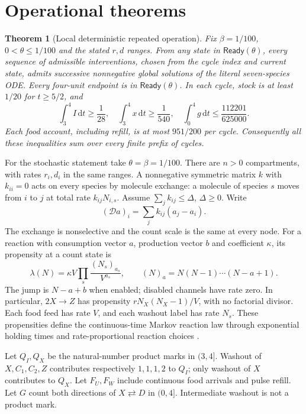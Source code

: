 \documentclass[11pt]{article}
\newtheorem{theorem}{Theorem}
\theoremstyle{definition}\newtheorem{definition}[theorem]{Definition}
\newcommand{\Ready}{\mathsf{Ready}}
\newcommand{\dd}{\,\mathrm dt}
\begin{document}
\pagebreak[3]
\section{Operational theorems}
\begin{theorem}[Local deterministic repeated operation]\label{thm:det}
Fix $\beta=1/100$, $0<\theta\le1/100$ and the stated $r,d$ ranges.
From any state in $\Ready(\theta)$, every sequence of admissible interventions,
chosen from the cycle index and current state, admits successive nonnegative global
solutions of the literal seven-species ODE. Every four-unit endpoint is in
$\Ready(\theta)$. In each cycle, stock is at least $1/20$ for $t\ge5/2$, and
\begin{equation}\label{eq:detoutputs}
\int_3^4 I\dd\ge\frac1{28},\quad
\int_3^4 x\dd\ge\frac1{540},\quad
\int_0^4 g\dd\le\frac{112201}{625000}.
\end{equation}
Each food account, including refill, is at most $951/200$ per cycle.
Consequently all these inequalities sum over every finite prefix of cycles.
\end{theorem}

For the stochastic statement take $\theta=\beta=1/100$. There are $n>0$ compartments,
with rates $r_i,d_i$ in the same ranges. A nonnegative symmetric matrix $k$ with $k_{ii}=0$ acts on every
species by molecule exchange: a molecule of species $s$ moves from $i$ to $j$ at total
rate $k_{ij}N_{i,s}$. Assume $\sum_j k_{ij}\le\Delta$, $\Delta\ge0$. Write
\[
(\mathcal D a)_i=\sum_j k_{ij}(a_j-a_i).
\]
The exchange is nonselective and the count scale is the same at every node.
For a reaction with consumption vector $a$, production vector $b$ and coefficient $\kappa$,
its propensity at a count state is
\begin{equation}\label{eq:propensity}
\lambda(N)=\kappa V\prod_s\frac{(N_s)_{a_s}}{V^{a_s}},
\qquad (N)_a=N(N-1)\cdots(N-a+1).
\end{equation}
The jump is $N-a+b$ when enabled; disabled channels have rate zero.
In particular, $2X\to Z$ has propensity $rN_X(N_X-1)/V$, with no factorial divisor.
Each food feed has rate $V$, and each washout label has rate $N_s$.
These propensities define the continuous-time Markov reaction law through exponential
holding times and rate-proportional reaction choices \citep{gillespie1977}.

Let $Q_I,Q_X$ be the natural-number product marks in $(3,4]$.
Washout of $X,C_1,C_2,Z$ contributes respectively $1,1,1,2$ to $Q_I$;
only washout of $X$ contributes to $Q_X$. Let $F_U,F_W$ include continuous food arrivals
and pulse refill. Let $G$ count both directions of $X\rightleftarrows D$ in $(0,4]$.
Intermediate washout is not a product mark.
\end{document}
